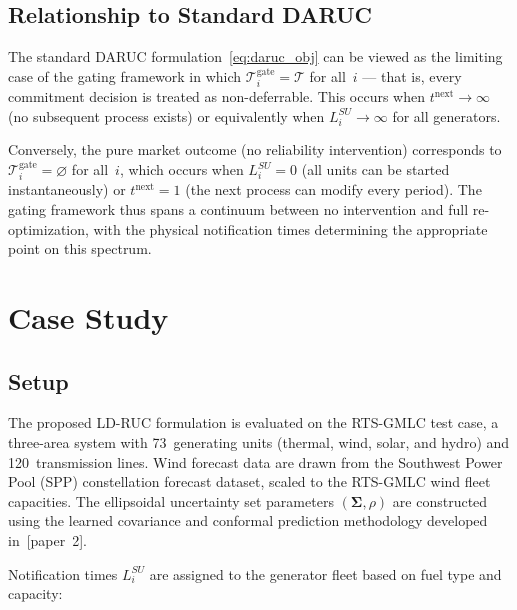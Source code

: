 \documentclass[journal]{IEEEtran}
\begin{document}
\subsection{Relationship to Standard DARUC}

The standard DARUC formulation~\eqref{eq:daruc_obj} can be viewed as
the limiting case of the gating framework in which
$\mathcal{T}_i^{\text{gate}} = \mathcal{T}$ for all~$i$ --- that is,
every commitment decision is treated as non-deferrable.
This occurs when $t^{\text{next}} \to \infty$ (no subsequent process
exists) or equivalently when $L_i^{SU} \to \infty$ for all
generators.

Conversely, the pure market outcome (no reliability intervention)
corresponds to $\mathcal{T}_i^{\text{gate}} = \varnothing$ for
all~$i$, which occurs when $L_i^{SU} = 0$ (all units can be started
instantaneously) or $t^{\text{next}} = 1$ (the next process can
modify every period).
The gating framework thus spans a continuum between no intervention
and full re-optimization, with the physical notification times
determining the appropriate point on this spectrum.


\section{Case Study}\label{sec:casestudy}

\subsection{Setup}

The proposed LD-RUC formulation is evaluated on the RTS-GMLC test
case, a three-area system with 73~generating units (thermal, wind,
solar, and hydro) and 120~transmission lines.
Wind forecast data are drawn from the Southwest Power Pool (SPP)
constellation forecast dataset, scaled to the RTS-GMLC wind fleet
capacities.
The ellipsoidal uncertainty set parameters
$(\boldsymbol{\Sigma}, \rho)$ are constructed using the learned
covariance and conformal prediction methodology developed
in~[paper~2].

Notification times $L_i^{SU}$ are assigned to the generator fleet
based on fuel type and capacity:
\end{document}
